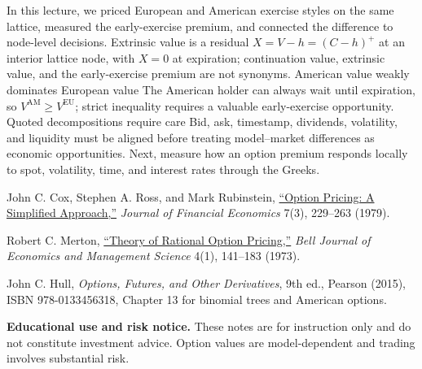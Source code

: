 \documentclass[11pt]{article}
\begin{document}
\Needspace{0.38\textheight}
\keytakeaways
  {In this lecture, we priced European and American exercise styles on the same lattice, measured the early-exercise premium, and connected the difference to node-level decisions.}
  {Extrinsic value is a residual}
  {$X=V-h=(C-h)^+$ at an interior lattice node, with $X=0$ at expiration; continuation value, extrinsic value, and the early-exercise premium are not synonyms.}
  {American value weakly dominates European value}
  {The American holder can always wait until expiration, so $V^{\mathrm{AM}}\geq V^{\mathrm{EU}}$; strict inequality requires a valuable early-exercise opportunity.}
  {Quoted decompositions require care}
  {Bid, ask, timestamp, dividends, volatility, and liquidity must be aligned before treating model--market differences as economic opportunities.}
  {Next, measure how an option premium responds locally to spot, volatility, time, and interest rates through the Greeks.}

\begin{readinglist}
  \item John C. Cox, Stephen A. Ross, and Mark Rubinstein, \href{https://doi.org/10.1016/0304-405X(79)90015-1}{``Option Pricing: A Simplified Approach,''} \emph{Journal of Financial Economics} 7(3), 229--263 (1979).
  \item Robert C. Merton, \href{https://doi.org/10.2307/1831029}{``Theory of Rational Option Pricing,''} \emph{Bell Journal of Economics and Management Science} 4(1), 141--183 (1973).
  \item John C. Hull, \emph{Options, Futures, and Other Derivatives}, 9th ed., Pearson (2015), ISBN 978-0133456318, Chapter 13 for binomial trees and American options.
\end{readinglist}

\vfill
{\sffamily\footnotesize\color{vnmuted}\textbf{Educational use and risk notice.} These notes are for instruction only and do not constitute investment advice. Option values are model-dependent and trading involves substantial risk.}
\end{document}
